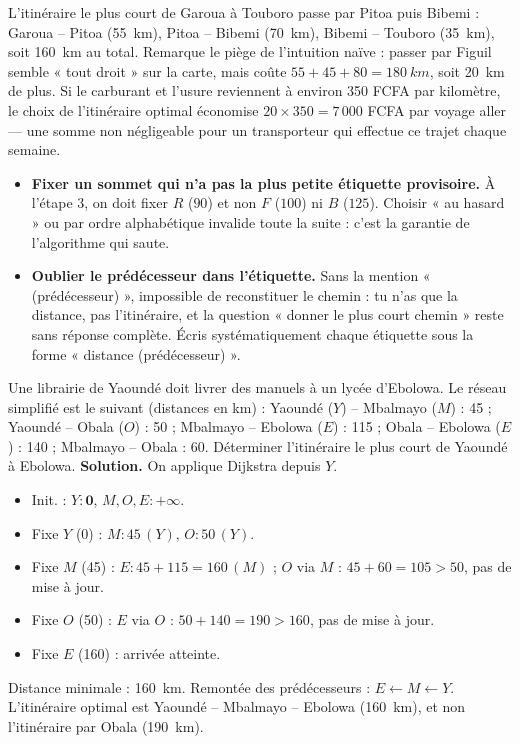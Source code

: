 \documentclass[11pt]{article}
\begin{document}
\begin{exemplebox}
L'itinéraire le plus court de Garoua à Touboro passe par Pitoa puis Bibemi : Garoua -- Pitoa (\SI{55}{km}), Pitoa -- Bibemi (\SI{70}{km}), Bibemi -- Touboro (\SI{35}{km}), soit \SI{160}{km} au total. Remarque le piège de l'intuition naïve : passer par Figuil semble « tout droit » sur la carte, mais coûte $55 + 45 + 80 = \SI{180}{km}$, soit \SI{20}{km} de plus. Si le carburant et l'usure reviennent à environ 350 FCFA par kilomètre, le choix de l'itinéraire optimal économise $20 \times 350 = 7\,000$ FCFA par voyage aller — une somme non négligeable pour un transporteur qui effectue ce trajet chaque semaine.
\end{exemplebox}

\begin{attention}
\begin{itemize}
\item \textbf{Fixer un sommet qui n'a pas la plus petite étiquette provisoire.} À l'étape 3, on doit fixer $R$ ($90$) et non $F$ ($100$) ni $B$ ($125$). Choisir « au hasard » ou par ordre alphabétique invalide toute la suite : c'est la garantie de l'algorithme qui saute.
\item \textbf{Oublier le prédécesseur dans l'étiquette.} Sans la mention « (prédécesseur) », impossible de reconstituer le chemin : tu n'as que la distance, pas l'itinéraire, et la question « donner le plus court chemin » reste sans réponse complète. Écris systématiquement chaque étiquette sous la forme « distance (prédécesseur) ».
\end{itemize}
\end{attention}

\begin{exoresolu}
Une librairie de Yaoundé doit livrer des manuels à un lycée d'Ebolowa. Le réseau simplifié est le suivant (distances en km) : Yaoundé ($Y$) -- Mbalmayo ($M$) : 45 ; Yaoundé -- Obala ($O$) : 50 ; Mbalmayo -- Ebolowa ($E$) : 115 ; Obala -- Ebolowa ($E$) : 140 ; Mbalmayo -- Obala : 60. Déterminer l'itinéraire le plus court de Yaoundé à Ebolowa.
\tcblower
\textbf{Solution.} On applique Dijkstra depuis $Y$.
\begin{itemize}
\item Init. : $Y : \mathbf{0}$, $M, O, E : +\infty$.
\item Fixe $Y$ (0) : $M : 45\,(Y)$, $O : 50\,(Y)$.
\item Fixe $M$ (45) : $E : 45+115 = 160\,(M)$ ; $O$ via $M$ : $45+60=105 > 50$, pas de mise à jour.
\item Fixe $O$ (50) : $E$ via $O$ : $50+140 = 190 > 160$, pas de mise à jour.
\item Fixe $E$ (160) : arrivée atteinte.
\end{itemize}
Distance minimale : \SI{160}{km}. Remontée des prédécesseurs : $E \leftarrow M \leftarrow Y$. L'itinéraire optimal est Yaoundé -- Mbalmayo -- Ebolowa (\SI{160}{km}), et non l'itinéraire par Obala (\SI{190}{km}).
\end{exoresolu}
\end{document}
